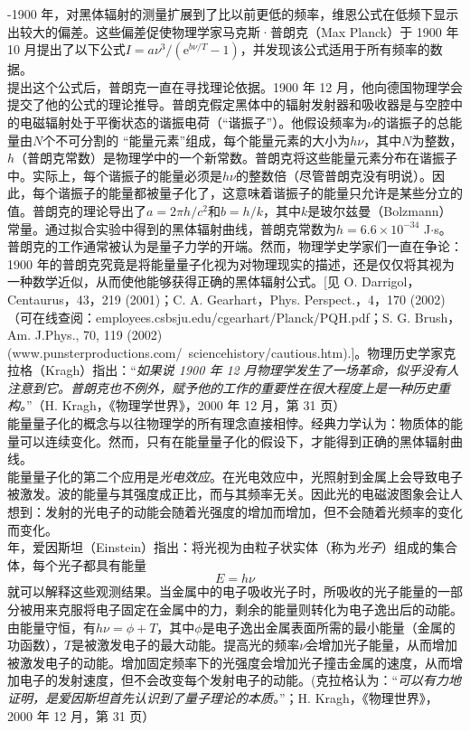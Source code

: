 	-1900 年，对黑体辐射的测量扩展到了比以前更低的频率，维恩公式在低频下显示出较大的偏差。这些偏差促使物理学家马克斯·普朗克（Max Planck）于 1900 年 10 月提出了以下公式$I=a \nu^3 / \left(\text{e}^{b\nu / T}-1\right)$，并发现该公式适用于所有频率的数据。\\
	\indent 提出这个公式后，普朗克一直在寻找理论依据。1900 年 12 月，他向德国物理学会提交了他的公式的理论推导。普朗克假定黑体中的辐射发射器和吸收器是与空腔中的电磁辐射处于平衡状态的谐振电荷（“谐振子”）。他假设频率为$\nu$的谐振子的总能量由$N$个不可分割的 “能量元素”组成，每个能量元素的大小为$h\nu$，其中$N$为整数，$h$（普朗克常数）是物理学中的一个新常数。普朗克将这些能量元素分布在谐振子中。实际上，每个谐振子的能量必须是$h\nu$的整数倍（尽管普朗克没有明说）。因此，每个谐振子的能量都被量子化了，这意味着谐振子的能量只允许是某些分立的值。普朗克的理论导出了$a=2 \pi  h/c^2$和$b=h/k$，其中$k$是玻尔兹曼（Bolzmann）常量。通过拟合实验中得到的黑体辐射曲线，普朗克常数为$h=6.6 \times 10^{-34}$ J$\cdot$s。\\
	\indent 普朗克的工作通常被认为是量子力学的开端。然而，物理学史学家们一直在争论：1900 年的普朗克究竟是将能量量子化视为对物理现实的描述，还是仅仅将其视为一种数学近似，从而使他能够获得正确的黑体辐射公式。[见 O. Darrigol，Centaurus，43，219 (2001)；C. A. Gearhart，Phys. Perspect.，4，170 (2002)（可在线查阅：employees.csbsju.edu/cgearhart/Planck/PQH.pdf；S. G. Brush，Am. J.Phys., 70, 119 (2002) (www.punsterproductions.com/~sciencehistory/cautious.htm).]。物理历史学家克拉格（Kragh）指出：“\textit{如果说 1900 年 12 月物理学发生了一场革命，似乎没有人注意到它。普朗克也不例外，赋予他的工作的重要性在很大程度上是一种历史重构。}”（H. Kragh，《物理学世界》，2000 年 12 月，第 31 页）\\
	\indent 能量量子化的概念与以往物理学的所有理念直接相悖。经典力学认为：物质体的能量可以连续变化。然而，只有在能量量子化的假设下，才能得到正确的黑体辐射曲线。\\
	\indent 能量量子化的第二个应用是\textit{光电效应}。在光电效应中，光照射到金属上会导致电子被激发。波的能量与其强度成正比，而与其频率无关。因此光的电磁波图象会让人想到：发射的光电子的动能会随着光强度的增加而增加，但不会随着光频率的变化而变化。\\
	 年，爱因斯坦（Einstein）指出：将光视为由粒子状实体（称为\textit{光子}）组成的集合体，每个光子都具有能量
	\begin{equation}
		\boxed{E=h\nu}
		\label{eq:1.3 photoelectric effect equation}
	\end{equation}
	就可以解释这些观测结果。当金属中的电子吸收光子时，所吸收的光子能量的一部分被用来克服将电子固定在金属中的力，剩余的能量则转化为电子逸出后的动能。由能量守恒，有$h\nu = \phi+ T$，其中$\phi$是电子逸出金属表面所需的最小能量（金属的功函数），$T$是被激发电子的最大动能。提高光的频率$\nu$会增加光子能量，从而增加被激发电子的动能。增加固定频率下的光强度会增加光子撞击金属的速度，从而增加电子的发射速度，但不会改变每个发射电子的动能。(克拉格认为：“\textit{可以有力地证明，是爱因斯坦首先认识到了量子理论的本质。}”；H. Kragh，《物理世界》，2000 年 12 月，第 31 页）\\

